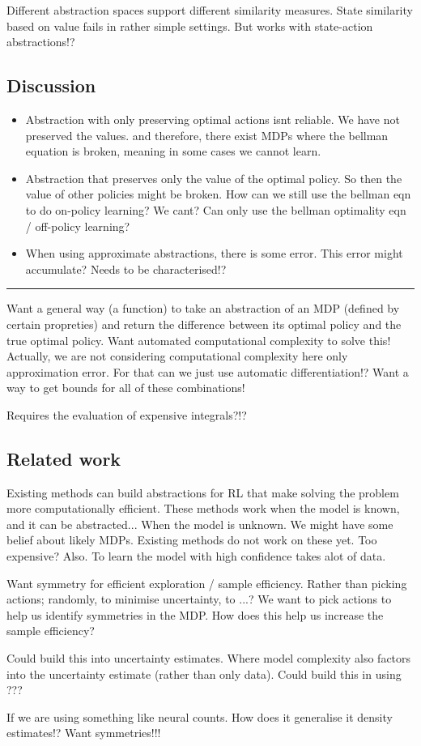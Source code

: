 Different abstraction spaces support different similarity measures.
State similarity based on value fails in rather simple settings.
But works with state-action abstractions!?


\subsection{Discussion}



\begin{itemize}
  \item Abstraction with only preserving optimal actions isnt reliable. We have not preserved the values.
  and therefore, there exist MDPs where the bellman equation is broken, meaning in some cases we cannot learn.
  \item Abstraction that preserves only the value of the optimal policy. So then the value of other policies might be broken.
  How can we still use the bellman eqn to do on-policy learning? We cant? Can only use the bellman optimality eqn / off-policy learning?
  \item When using approximate abstractions, there is some error. This error might accumulate? Needs to be characterised!?
\end{itemize}


\begin{center}\rule{0.5\linewidth}{\linethickness}\end{center}

Want a general way (a function) to take an abstraction of an MDP
(defined by certain propreties) and return the difference between its
optimal policy and the true optimal policy. Want automated computational
complexity to solve this! Actually, we are not considering computational
complexity here only approximation error. For that can we just use
automatic differentiation!? Want a way to get bounds for all of these
combinations!

Requires the evaluation of expensive integrals?!?

\subsection{Related work}

Existing methods can build abstractions for RL that make solving the problem more computationally efficient.
These methods work when the model is known, and it can be abstracted...
When the model is unknown. We might have some belief about likely MDPs. Existing methods do not work on these yet. Too expensive?
Also. To learn the model with high confidence takes alot of data.

Want symmetry for efficient exploration / sample efficiency.
Rather than picking actions; randomly, to minimise uncertainty, to ...?
We want to pick actions to help us identify symmetries in the MDP.
How does this help us increase the sample efficiency?

Could build this into uncertainty estimates. Where model complexity also factors into the uncertainty estimate (rather than only data).
Could build this in using ???

If we are using something like neural counts. How does it generalise it density estimates!?
Want symmetries!!!

